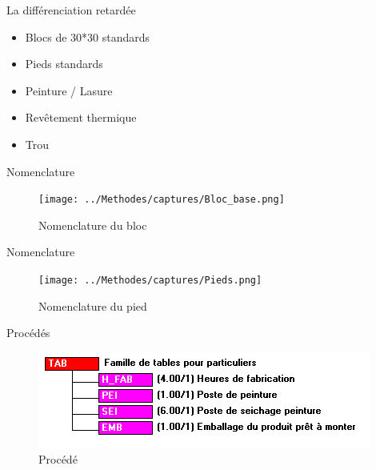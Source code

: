 
\begin{frame}{La différenciation retardée}
\begin{itemize}
\item<1-> Blocs de 30*30 standards 
\item<2-> Pieds standards
\item<3-> Peinture / Lasure
\item<4-> Revêtement thermique
\item<5-> Trou 
\end{itemize}
\end{frame}

\begin{frame}{Nomenclature}
	\begin{figure}[H]
\centering
\texttt{[image: ../Methodes/captures/Bloc\_base.png]}
\caption{Nomenclature du bloc}
	\end{figure}		
\end{frame}

\begin{frame}{Nomenclature}
	\begin{figure}[H]
\centering
\texttt{[image: ../Methodes/captures/Pieds.png]}
\caption{Nomenclature du pied}
	\end{figure}		
\end{frame}

\begin{frame}{Procédés}
	\begin{figure}[H]
\centering
\includegraphics[scale=0.4]{../Methodes/captures/procede_fab_table_particulier.PNG}
\caption{Procédé}
	\end{figure}		
\end{frame}
